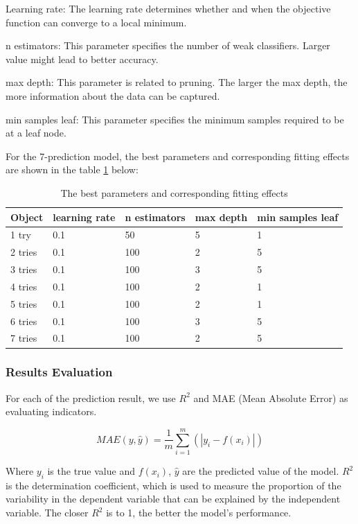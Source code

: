 \documentclass[
  journal=medium,
  manuscript=Report,
  year=2023,
  volume=37,
]{cup-journal}
\begin{document}
Learning rate: The learning rate determines whether and when the objective function can converge to a local minimum. 

n estimators: This parameter specifies the number of weak classifiers. Larger value might lead to better accuracy. 

max depth: This parameter is related to pruning. The larger the max depth, the more information about the data can be captured. 

min samples leaf: This parameter specifies the minimum samples required to be at a leaf node. 

For the 7-prediction model, the best parameters and corresponding fitting effects are shown in the table \ref{best parameters} below: 

\begin{table}[hbt!]
    \begin{threeparttable}
    \caption{The best parameters and corresponding fitting effects}
    \label{best parameters}
    \begin{tabular}{lllll}
    \toprule
    \headrow Object & learning rate & n estimators & max depth & min samples leaf\\ 
    \midrule
    1 try & 0.1 & 50 & 5 & 1 \\ 
    \midrule
    2 tries & 0.1 & 100 & 2 & 5 \\ 
    \midrule
    3 tries & 0.1 & 100 & 3 & 5 \\ 
    \midrule
    4 tries & 0.1 & 100 & 2 & 1 \\ 
    \midrule
    5 tries & 0.1 & 100 & 2 & 1 \\ 
    \midrule
    6 tries & 0.1 & 100 & 3 & 5 \\ 
    \midrule
    7 tries & 0.1 & 100 & 2 & 5 \\ 
    \bottomrule 
    \end{tabular}
    \end{threeparttable}
\end{table}

\subsubsection{Results Evaluation}

    For each of the prediction result, we use $R^2$ and MAE (Mean Absolute Error) as evaluating indicators. 

$$MAE(y,\widehat{y}) = \frac{1}{m}\sum_{i=1}^{m}(|y_i - f(x_i)|)$$

Where $y_i$ is the true value and $f(x_i)$, $\widehat{y}$ are the predicted value of the model. $R^2$ is the determination coefficient, which is used to measure the proportion of the variability in the dependent variable that can be explained by the independent variable. The closer $R^2$ is to 1, the better the model’s performance. 
\end{document}
